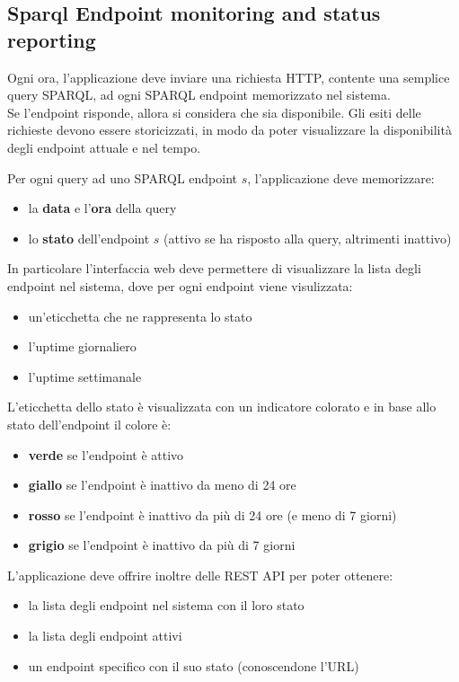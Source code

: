 \documentclass{article}
\begin{document}
\subsection{Sparql Endpoint monitoring and status reporting}

Ogni ora, l'applicazione deve inviare una richiesta HTTP, contente
una semplice query SPARQL, ad ogni SPARQL endpoint memorizzato nel sistema.\\
Se l'endpoint risponde, allora si considera che sia disponibile.
Gli esiti delle richieste devono essere storicizzati, in modo da poter visualizzare
la disponibilità degli endpoint attuale e nel tempo.

Per ogni query ad uno SPARQL endpoint $s$, l'applicazione deve memorizzare:
\begin{itemize}
    \item la \textbf{data} e l'\textbf{ora} della query
    \item lo \textbf{stato} dell'endpoint $s$ (attivo se ha risposto alla query, altrimenti inattivo)
\end{itemize}

In particolare l'interfaccia web deve permettere di visualizzare
la lista degli endpoint nel sistema, dove per ogni endpoint viene visulizzata:
\begin{itemize}
    \item un'eticchetta che ne rappresenta lo stato
    \item l'uptime giornaliero
    \item l'uptime settimanale
\end{itemize}

L'eticchetta dello stato è visualizzata con un indicatore colorato e in base allo stato dell'endpoint il colore è:
\begin{itemize}
    \item \textbf{verde} se l'endpoint è attivo
    \item \textbf{giallo} se l'endpoint è inattivo da meno di 24 ore
    \item \textbf{rosso} se l'endpoint è inattivo da più di 24 ore (e meno di 7 giorni)
    \item \textbf{grigio} se l'endpoint è inattivo da più di 7 giorni
\end{itemize}

L'applicazione deve offrire inoltre delle REST API per poter ottenere:
\begin{itemize}
    \item la lista degli endpoint nel sistema con il loro stato
    \item la lista degli endpoint attivi
    \item un endpoint specifico con il suo stato (conoscendone l'URL)
\end{itemize}
\end{document}
